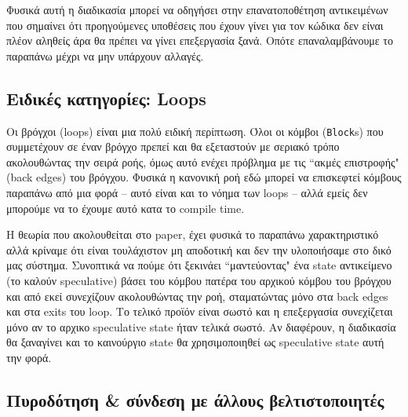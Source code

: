 Φυσικά αυτή η διαδικασία μπορεί να οδηγήσει στην επανατοποθέτηση αντικειμένων
που σημαίνει ότι προηγούμενες υποθέσεις που έχουν γίνει για τον κώδικα δεν είναι
πλέον αληθείς άρα θα πρέπει να γίνει επεξεργασία ξανά. Οπότε επαναλαμβάνουμε το
παραπάνω μέχρι να μην υπάρχουν αλλαγές.


\subsection{Ειδικές κατηγορίες: Loops}

Οι βρόγχοι (loops) είναι μια πολύ ειδική περίπτωση. Όλοι οι κόμβοι
(\texttt{Block}s) που συμμετέχουν σε έναν βρόγχο πρεπεί και θα εξεταστούν με
σεριακό τρόπο ακολουθώντας την σειρά ροής, όμως αυτό ενέχει πρόβλημα με τις
``ακμές επιστροφής" (back edges) του βρόγχου. Φυσικά η κανονική ροή εδώ μπορεί να
επισκεφτεί κόμβους παραπάνω από μια φορά – αυτό είναι και το νόημα των loops –
αλλά εμείς δεν μπορούμε να το έχουμε αυτό κατα το compile time.

Η θεωρία που ακολουθείται στο paper, έχει φυσικά το παραπάνω χαρακτηριστικό αλλά
κρίναμε ότι είναι τουλάχιστον μη αποδοτική και δεν την υλοποιήσαμε στο δικό μας
σύστημα. Συνοπτικά να πούμε ότι ξεκινάει ``μαντεύοντας" ένα state αντικείμενο (το
καλούν speculative) βάσει του κόμβου πατέρα του αρχικού κόμβου του βρόγχου και
από εκεί συνεχίζουν ακολουθώντας την ροή, σταματώντας μόνο στα back edges και
στα exits του loop. Το τελικό προϊόν είναι σωστό και η επεξεργασία συνεχίζεται
μόνο αν το αρχικο speculative state ήταν τελικά σωστό. Αν διαφέρουν, η
διαδικασία θα ξαναγίνει και το καινούργιο state θα χρησιμοποιηθεί ως speculative
state αυτή την φορά.


\subsection{Πυροδότηση \& σύνδεση με άλλους βελτιστοποιητές}

